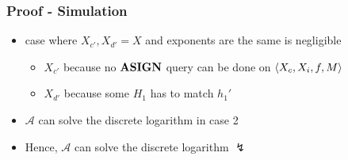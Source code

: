 \begin{frame}
  \frametitle{Proof - Simulation}
  
  \begin{itemize}[<+->]
    \item case where $X_{c'},X_{d'} = X$ and exponents are the same is negligible
    \begin{itemize}[<+->]
      \item $X_{c'}$ because no $\textbf{ASIGN}$ query can be done on $\langle X_c, X_i, f, M \rangle$
      \item $X_{d'}$ because some $H_1$ has to match $h_1'$ 
    \end{itemize}
    \item $\mathcal{A}$ can solve the discrete logarithm in case 2
    \item Hence, $\mathcal{A}$ can solve the discrete logarithm $\lightning$
  \end{itemize}

\end{frame}